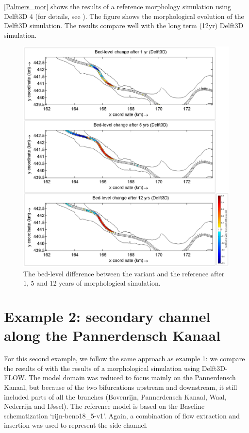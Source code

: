 
\autoref{Palmers_mor} shows the results of a reference morphology simulation using Delft3D 4 (for details, see \citet{GiriJagers2022}).
The figure shows the morphological evolution of the Delft3D simulation.
The \dfastmi results compare well with the long term (12yr) Delft3D simulation.

\begin{figure}
\center
\includegraphics[width=\textwidth]{figures/Palmers_mor.png}
\caption{The bed-level difference between the variant and the reference after 1, 5 and 12 years of morphological simulation.}
\label{Palmers_mor}
\end{figure}


\section{Example 2: secondary channel along the Pannerdensch Kanaal}

For this second example, we follow the same approach as example 1: we compare the results of \dfastmi with the results of a morphological simulation using Delft3D-FLOW.
The model domain was reduced to focus mainly on the Pannerdensch Kanaal, but because of the two bifurcations upstream and downstream, it still included parts of all the branches (Bovenrijn, Pannerdensch Kanaal, Waal, Nederrijn and IJssel).
The reference model is based on the Baseline schematization ‘rijn-beno18\_5-v1’.
Again, a combination of flow extraction and insertion was used to represent the side channel.

